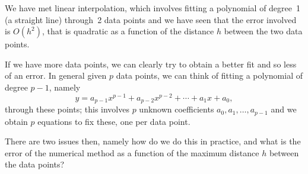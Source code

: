 We have met linear interpolation, which involves fitting a polynomial of degree~1 (a straight line)
through~2 data points and we have seen that the error involved is $O(h^2)$, that is quadratic 
as a function of the distance $h$ between the two data points. 

If we have more data points, we can clearly try to obtain a better fit and so less of an error. In 
general given $p$ data points, we can think of fitting a polynomial of degree $p-1$, namely 
%
\begin{equation}
y = a_{p-1} x^{p-1} + a_{p-2} x^{p-2} + \cdots + a_1 x + a_0, 
\end{equation}
%
through these points; this involves $p$ unknown coefficients $a_0, a_1, \ldots, a_{p-1}$ and we obtain $p$ equations
to fix these, one per data point. 

There are two issues then, namely how do we do this in practice, and what is the error of the numerical
method as a function of the maximum distance $h$ between the data points? 

